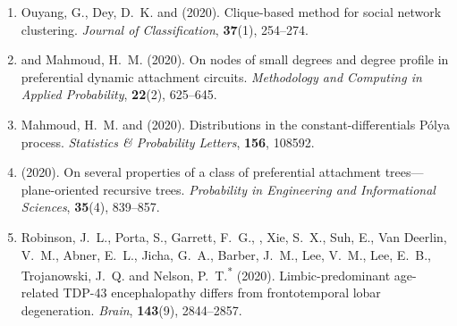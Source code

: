 \begin{enumerate}[resume=journalpubs]

\item\begin{cventry} Ouyang, G., Dey, D.\ K. and \PZ{} (2020). Clique-based method for social network clustering. \emph{Journal of Classification}, \textbf{37}(1), 254--274.

\par\end{cventry}
\item\begin{cventry} \PZ{} and Mahmoud, H.\ M. (2020). On nodes of small degrees and degree profile in preferential dynamic attachment circuits. \emph{Methodology and Computing in Applied Probability}, \textbf{22}(2), 625--645.

\par\end{cventry}
\item\begin{cventry} Mahmoud, H.\ M. and \PZ{} (2020). Distributions in the constant-differentials P\'{o}lya process. \emph{Statistics \& Probability Letters}, \textbf{156}, 108592.

\par\end{cventry}
\item\begin{cventry} \PZ{} (2020). On several properties of a class of preferential attachment trees---plane-oriented recursive trees. \emph{Probability in Engineering and Informational Sciences}, \textbf{35}(4), 839--857.


\par\end{cventry}
\item\begin{cventry} Robinson, J.\ L., Porta, S., Garrett, F.\ G., \PZnot{}, Xie, S.\ X., Suh, E., Van Deerlin, V.\ M., Abner, E.\ L., Jicha, G.\ A., Barber, J.\ M., Lee, V.\ M., Lee, E.\ B., Trojanowski, J.\ Q. and Nelson, P.\ T.\textsuperscript{*} (2020). Limbic-predominant age-related TDP-43 encephalopathy differs from frontotemporal lobar degeneration. \emph{Brain}, \textbf{143}(9), 2844--2857.


\end{cventry}
\end{enumerate}

